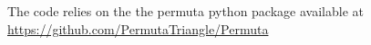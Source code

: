 The code relies on the the permuta python package available at \url{https://github.com/PermutaTriangle/Permuta}
% 
%
%
%
% 
%

